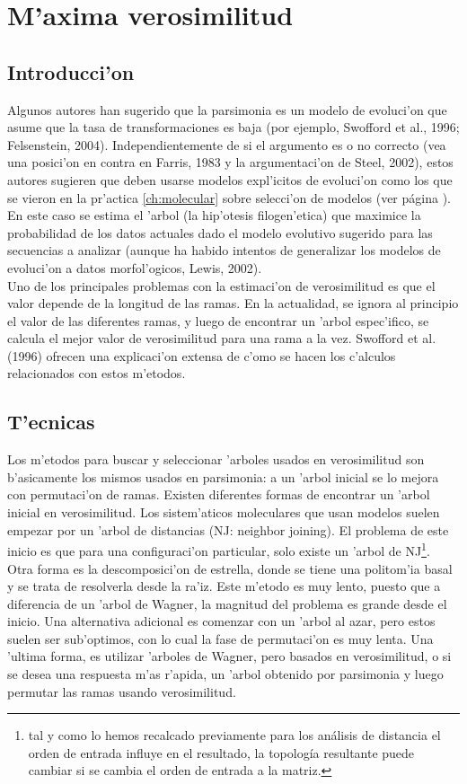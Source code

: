 \chapter{M'axima verosimilitud}
\section*{Introducci'on}
\label{ch:likelihood}
Algunos autores han sugerido que la parsimonia es un modelo de evoluci'on que asume que la tasa de transformaciones es baja (por ejemplo, Swofford et al., 1996; Felsenstein, 2004). Independientemente de si el argumento es o no correcto (vea una posici'on en contra en Farris, 1983 y la argumentaci'on de Steel, 2002), estos autores sugieren que deben usarse modelos expl'icitos de evoluci'on como los que se vieron en la pr'actica \ref{ch:molecular} sobre selecci'on de modelos (ver p\'agina \pageref{ch:molecular}).\\
En este caso se estima el 'arbol (la hip'otesis filogen'etica) que maximice la probabilidad de los datos actuales dado el modelo evolutivo sugerido para las secuencias a analizar (aunque ha habido intentos de generalizar los modelos de evoluci'on a datos morfol'ogicos, Lewis, 2002).\\
Uno de los principales problemas con la estimaci'on de verosimilitud es que el valor depende de la longitud de las ramas. En la actualidad, se ignora al principio el valor de las diferentes ramas, y luego de encontrar un 'arbol espec'ifico, se calcula el mejor valor de verosimilitud para una rama a la vez. Swofford et al. (1996) ofrecen una explicaci'on extensa de c'omo se hacen los c'alculos relacionados con estos m'etodos.
\section{T'ecnicas}
Los m'etodos para buscar y seleccionar 'arboles usados en verosimilitud son b'asicamente los mismos usados en parsimonia: a un 'arbol inicial se lo mejora con permutaci'on de ramas. Existen diferentes formas de encontrar un 'arbol inicial en verosimilitud. Los sistem'aticos moleculares que usan modelos suelen empezar por un 'arbol de distancias (NJ: neighbor joining). El problema de este inicio es que para una configuraci'on particular, solo existe un 'arbol de NJ\footnote{tal y como lo hemos recalcado previamente para los an\'alisis de distancia el orden de entrada influye en el resultado, la topolog\'ia resultante puede cambiar si se cambia el orden de entrada a la matriz.}. Otra forma es la descomposici'on de estrella, donde se tiene una politom'ia basal y se trata de resolverla desde la ra'iz. Este m'etodo es muy lento, puesto que a diferencia de un 'arbol de Wagner, la magnitud del problema es grande desde el inicio. Una alternativa adicional es comenzar con un 'arbol al azar, pero estos suelen ser sub'optimos, con lo cual la fase de permutaci'on es muy lenta. Una 'ultima forma, es utilizar 'arboles de Wagner, pero basados en verosimilitud, o si se desea una respuesta m'as r'apida, un 'arbol obtenido por parsimonia y luego permutar las ramas usando verosimilitud.
